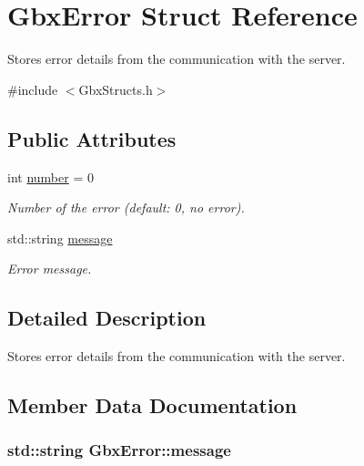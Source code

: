 \hypertarget{structGbxError}{\section{Gbx\-Error Struct Reference}
\label{structGbxError}
}


Stores error details from the communication with the server.  




{\ttfamily \#include $<$Gbx\-Structs.\-h$>$}

\subsection*{Public Attributes}
\begin{DoxyCompactItemize}
\item 
int \hyperlink{structGbxError_ae5627cae63e837beaa75f798e47be50e}{number} = 0
\begin{DoxyCompactList}\small\item\em Number of the error (default\-: 0, no error). \end{DoxyCompactList}\item 
std\-::string \hyperlink{structGbxError_af52353692b5c160deac99c4285f01a5a}{message}
\begin{DoxyCompactList}\small\item\em Error message. \end{DoxyCompactList}\end{DoxyCompactItemize}


\subsection{Detailed Description}
Stores error details from the communication with the server. 

\subsection{Member Data Documentation}
\hypertarget{structGbxError_af52353692b5c160deac99c4285f01a5a}{
\subsubsection[{message}]{\setlength{\rightskip}{0pt plus 5cm}std\-::string Gbx\-Error\-::message}}\label{structGbxError_af52353692b5c160deac99c4285f01a5a}



